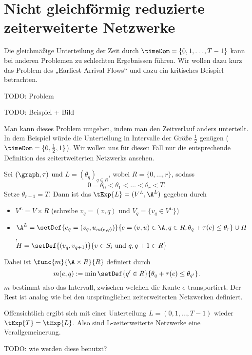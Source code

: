 \section{Nicht gleichförmig reduzierte zeiterweiterte Netzwerke}\label{sec:nonunif_cond}
Die gleichmäßige Unterteilung der Zeit durch $\timeDom = \{0,1, \ldots, T-1\}$ kann bei
anderen Problemen zu schlechten Ergebnissen führen. Wir wollen dazu kurz das Problem
des „Earliest Arrival Flows“ und dazu ein kritisches Beispiel betrachten.

TODO: Problem

TODO: Beispiel + Bild

Man kann dieses Problem umgehen, indem man den Zeitverlauf anders unterteilt. In dem
Beispiel würde die Unterteilung in Intervalle der Größe $\frac{1}{2}$
genügen ($\timeDom = \{0, \frac{1}{2}, 1\}$). Wir wollen uns für diesen Fall nur
die entsprechende Definition des zeitertweiterten Netzwerks ansehen.

\begin{definition}
    Sei $(\graph, \tau)$ und $L = (\theta_q)_{q \in R}$, wobei $R = \{0, \ldots, r\}$,
    sodass
    \[
        0 = \theta_0 < \theta_1 < \ldots < \theta_r < T.
    \]
    Setze $\theta_{r+1} = T$.
    Dann ist das  $\tExp{L} = (V^L, \A^L)$
    gegeben durch
    \begin{itemize}
        \item $V^L = V \times R$ (schreibe $v_q = (v, q)$ und
            $V_q = \{v_q \in V^L\}$)
        \item $\A^L = \setDef{e_q = (v_q, u_{m(e, q)})}
                        {e = (v, u) \in \A, q \in R, \theta_q + \tau(e) \leq \theta_r}
                    \cup H$, \\
             $H = \setDef{(v_q, v_{q+1})}
                                    {v \in S_i \text{ und } q, q+1 \in R}$
    \end{itemize}

    Dabei ist $\func{m}{\A \times R}{R}$ definiert durch
    \[
        m(e, q) := \min \setDef{q' \in R}{\theta_q + \tau(e) \leq \theta_{q'}}.
    \]
    $m$ bestimmt also das Intervall, zwischen welchen die Kante $e$ transportiert.
    Der Rest ist analog wie bei den ursprünglichen zeiterweiterten Netzwerken
    definiert.
\end{definition}

\begin{remark}
    Offensichtlich ergibt sich mit einer Unterteilung $L = (0, 1, \ldots, T-1)$
    wieder $\tExp{T} = \tExp{L}$. Also sind L-zeiterweiterte Netzwerke
    eine Verallgemeinerung.
\end{remark}

TODO: wie werden diese benutzt?
